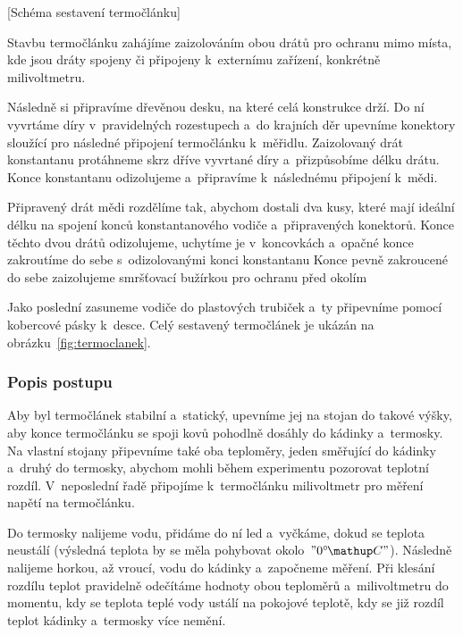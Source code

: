 [Schéma sestavení termočlánku]

Stavbu termočlánku zahájíme zaizolováním obou drátů pro ochranu mimo místa, kde
jsou dráty spojeny či připojeny k~externímu zařízení, konkrétně milivoltmetru.

Následně si připravíme dřevěnou desku, na které celá konstrukce drží.
Do ní vyvrtáme díry v~pravidelných rozestupech a~do krajních děr upevníme
konektory sloužící pro následné připojení termočlánku k~měřidlu. Zaizolovaný
drát konstantanu protáhneme skrz dříve vyvrtané díry a~přizpůsobíme
délku drátu. Konce konstantanu odizolujeme a~připravíme k~následnému
připojení k~mědi.

Připravený drát mědi rozdělíme tak, abychom dostali dva kusy, které mají
ideální délku na spojení konců konstantanového vodiče a~připravených konektorů.
Konce těchto dvou drátů odizolujeme, uchytíme je v~koncovkách a~opačné
konce zakroutíme do sebe s~odizolovanými konci konstantanu%
Konce pevně zakroucené do sebe zaizolujeme smršťovací bužírkou pro ochranu
před okolím

Jako poslední zasuneme vodiče do plastových trubiček a~ty připevníme pomocí
kobercové pásky k~desce. Celý sestavený termočlánek je ukázán na
obrázku~\ref{fig:termoclanek}.

\subsubsection{Popis postupu}
Aby byl termočlánek stabilní a~statický, upevníme jej na stojan do takové
výšky, aby konce termočlánku se spoji kovů pohodlně dosáhly do kádinky
a~termosky. Na vlastní stojany připevníme také oba teploměry, jeden
směřující do kádinky a~druhý do termosky, abychom mohli během experimentu
pozorovat teplotní rozdíl. V~neposlední řadě připojíme k~termočlánku
milivoltmetr pro měření napětí na termočlánku. 

Do termosky nalijeme vodu, přidáme do ní led a~vyčkáme, dokud se teplota
neustálí (výsledná teplota by se měla pohybovat okolo~$"0 \C"$). Následně
nalijeme horkou, až vroucí, vodu do kádinky a~započneme měření. Při klesání
rozdílu teplot pravidelně odečítáme hodnoty obou teploměrů a~milivoltmetru
do momentu, kdy se teplota teplé vody ustálí na pokojové teplotě, kdy se
již rozdíl teplot kádinky a~termosky více nemění.


